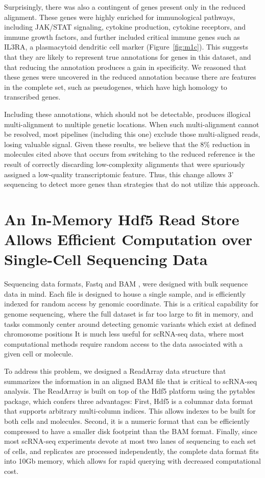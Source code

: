 Surprisingly, there was also a contingent of genes present only in the reduced alignment. 
These genes were highly enriched for immunological pathways, including JAK/STAT signaling, cytokine production, cytokine receptors, and immune growth factors, and further included critical immune genes such as IL3RA, a plasmacytoid dendritic cell marker (Figure~\ref{fig:m1c}).  
This suggests that they are likely to represent true annotations for genes in this dataset, and that reducing the annotation produces a gain in specificity. 
We reasoned that these genes were uncovered in the reduced annotation because there are features in the complete set, such as pseudogenes, which have high homology to transcribed genes. 

Including these annotations, which should not be detectable, produces illogical multi-alignment to multiple genetic locations. 
When such multi-alignment cannot be resolved, most pipelines (including this one) exclude those multi-aligned reads, losing valuable signal. 
Given these results, we believe that the 8\% reduction in molecules cited above that occurs from switching to the reduced reference is the result of correctly discarding low-complexity alignments that were spuriously assigned a low-quality transcriptomic feature.
Thus, this change allows 3' sequencing to detect more genes than strategies that do not utilize this approach.  

\section{An In-Memory Hdf5 Read Store Allows Efficient Computation over Single-Cell Sequencing Data} 

Sequencing data formats, Fastq \citep{Cock2009} and BAM \citep{Li2009}, were designed with bulk sequence data in mind.
Each file is designed to house a single sample, and is efficiently indexed for random access by genomic coordinate. 
This is a critical capability for genome sequencing, where the full dataset is far too large to fit in memory, and tasks commonly center around detecting genomic variants which exist at defined chromosome positions \citep{McKenna2010}
It is much less useful for scRNA-seq data, where most computational methods require random access to the data associated with a given cell or molecule. 

To address this problem, we designed a ReadArray data structure that summarizes the information in an aligned BAM file that is critical to scRNA-seq analysis. 
The ReadArray is built on top of the {\mono Hdf5} platform \citep{hdf5} using the {\mono pytables} package, which confers three advantages: 
First, Hdf5 is a columnar data format that supports arbitrary multi-column indices. 
This allows indexes to be built for both cells and molecules. 
Second, it is a numeric format that can be efficiently compressed \citep{Alted2010} to have a smaller disk footprint than the BAM format. 
Finally, since most scRNA-seq experiments devote at most two lanes of sequencing to each set of cells, and replicates are processed independently, the complete data format fits into 10Gb memory, which allows for rapid querying with decreased computational cost. 

